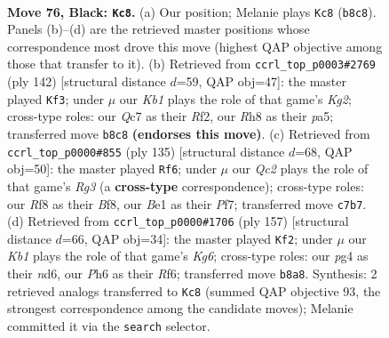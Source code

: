 \documentclass[11pt]{article}
\begin{document}
\clearpage

\begin{figure}[p]\centering
\begin{subfigure}{0.46\textwidth}\centering
\resizebox{\linewidth}{!}{%
\newchessgame
\chessboard[
  setfen={1k3r1r/p1q3p1/7p/7P/3P2P1/1Q2P3/7N/4b2K b - - 2 76},
  showmover=false,
  pgfstyle=straightmove, color=movearrow, markmove={b8-c8}
]}
\caption{}
\end{subfigure}\hfill
\begin{subfigure}{0.46\textwidth}\centering
\resizebox{\linewidth}{!}{%
\newchessgame
\chessboard[
  setfen={6nk/5Q1p/4P1p1/p2p2q1/8/1p6/1P3RK1/8 w - - 16 72},
  showmover=false,
  pgfstyle=straightmove, color=movearrow, markmove={g2-f3}
]}
\caption{}
\end{subfigure}
\\[4pt]
\begin{subfigure}{0.46\textwidth}\centering
\resizebox{\linewidth}{!}{%
\newchessgame
\chessboard[
  setfen={5b2/5pk1/p5rp/1p6/3Q4/1P5P/P5P1/7K b - - 59 68},
  showmover=false,
  pgfstyle=straightmove, color=movearrow, markmove={g6-f6}
]}
\caption{}
\end{subfigure}\hfill
\begin{subfigure}{0.46\textwidth}\centering
\resizebox{\linewidth}{!}{%
\newchessgame
\chessboard[
  setfen={8/8/1p1N1r1p/3P3Q/2Pnpq2/Pp4k1/1P6/K5R1 b - - 16 79},
  showmover=false,
  pgfstyle=straightmove, color=movearrow, markmove={g3-f2}
]}
\caption{}
\end{subfigure}
\caption{\textbf{Move 76, Black: \texttt{Kc8}.} (a) Our position; Melanie plays \texttt{Kc8} (\texttt{b8c8}). Panels (b)--(d) are the retrieved master positions whose correspondence most drove this move (highest QAP objective among those that transfer to it). (b) Retrieved from \texttt{ccrl\_top\_p0003\#2769} (ply 142) [structural distance $d$=59, QAP obj=47]: the master played \texttt{Kf3}; under $\mu$ our \emph{Kb1} plays the role of that game's \emph{Kg2}; cross-type roles: our \emph{Q}c7 as their \emph{R}f2, our \emph{R}h8 as their \emph{p}a5; transferred move \texttt{b8c8} \textbf{(endorses this move)}. (c) Retrieved from \texttt{ccrl\_top\_p0000\#855} (ply 135) [structural distance $d$=68, QAP obj=50]: the master played \texttt{Rf6}; under $\mu$ our \emph{Qc2} plays the role of that game's \emph{Rg3} (a \textbf{cross-type} correspondence); cross-type roles: our \emph{R}f8 as their \emph{B}f8, our \emph{B}e1 as their \emph{P}f7; transferred move \texttt{c7b7}. (d) Retrieved from \texttt{ccrl\_top\_p0000\#1706} (ply 157) [structural distance $d$=66, QAP obj=34]: the master played \texttt{Kf2}; under $\mu$ our \emph{Kb1} plays the role of that game's \emph{Kg6}; cross-type roles: our \emph{p}g4 as their \emph{n}d6, our \emph{P}h6 as their \emph{R}f6; transferred move \texttt{b8a8}. Synthesis: 2 retrieved analogs transferred to \texttt{Kc8} (summed QAP objective 93, the strongest correspondence among the candidate moves); Melanie committed it via the \texttt{search} selector.}
\label{fig:thought-m151}
\end{figure}
\end{document}
